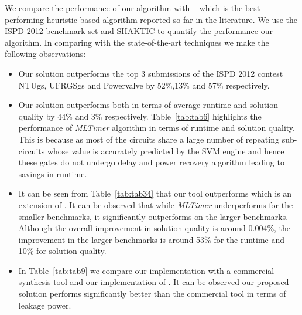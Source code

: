 We compare the performance of our algorithm with ~\cite{hu:12} which is the best performing heuristic based algorithm reported so far in the literature. We use the ISPD 2012 benchmark set and SHAKTIC to quantify the performance our algorithm. In comparing with the state-of-the-art techniques we make the following observations:
\begin{itemize}
\item Our solution outperforms the top 3 submissions of the ISPD 2012 contest NTUgs, UFRGSgs and Powervalve by 52\%,13\% and 57\% respectively.
\item Our solution outperforms \cite{hu:12} both in terms of average runtime and solution quality by 44\% and 3\% respectively. Table~\ref{tab:tab6} highlights the performance of \textit{MLTimer} algorithm in terms of runtime and solution quality. This is because as most of the circuits share a large  number of repeating sub-circuits whose value is accurately predicted by the SVM engine and hence these gates do not undergo delay and power recovery algorithm leading to savings in runtime. 
\item It can be seen from Table~\ref{tab:tab34} that our tool outperforms \cite{hu:13} which is an extension of \cite{hu:12}. It can be observed that while \textit{MLTimer} underperforms for the smaller benchmarks, it significantly outperforms \cite{hu:13} on the larger benchmarks. Although the overall improvement in solution quality is around 0.004\%, the improvement in the larger benchmarks is around 53\% for the runtime and 10\% for solution quality.
\item In Table~\ref{tab:tab9} we compare our implementation with a commercial synthesis tool and our implementation of \cite{hu:12}. It can be observed our proposed solution performs significantly better than the commercial tool in terms of leakage power. 
\end{itemize}

